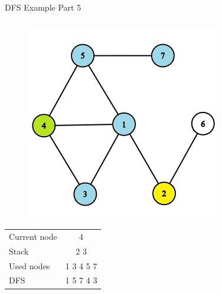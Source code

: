 \documentclass[aspectratio=169]{beamer}%
\begin{document}
\begin{frame}{DFS Example Part 5}
    \begin{columns}
        \begin{column}{0.32\textwidth}
            \begin{figure}[!ht]
                \centering
                \includegraphics[width=0.9\linewidth]{dfs 13.png}
            \end{figure}
            \begin{table}[ht]
                \centering
                \begin{tabular}{l c}
                    Current node & 4\\
                    Stack & 2 3\\ 
                    Used nodes & 1 3 4 5 7\\
                    DFS & 1 5 7 4 3 
                \end{tabular}
            \end{table}
        \end{column}
        \hfill
        \begin{column}{0.32\textwidth}
            \begin{figure}[!ht]
                \centering

\end{figure}
\end{column}
\end{columns}
\end{frame}
\end{document}
